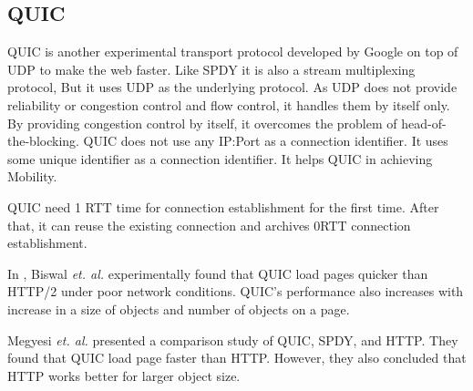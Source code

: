 \subsection{QUIC}
QUIC\cite{quic} is another experimental transport protocol developed by Google on top of UDP to make the web faster. Like SPDY it is also a stream multiplexing protocol, But it uses UDP as the underlying protocol. As UDP does not provide reliability or congestion control and flow control, it handles them by itself only. By providing congestion control by itself, it overcomes the problem of head-of-the-blocking. QUIC does not use any IP:Port as a connection identifier. It uses some unique identifier as a connection identifier. It helps QUIC in achieving Mobility.

QUIC need 1 RTT time for connection establishment for the first time. After that, it can reuse the existing connection and archives 0RTT connection establishment. 

In \cite{quicmakewebfast}, Biswal \textit{et. al.} experimentally found that QUIC load pages quicker than HTTP/2 under poor network conditions. QUIC's performance also increases with increase in a size of objects and number of objects on a page.

Megyesi \textit{et. al.} presented a comparison study of QUIC, SPDY, and HTTP\cite{quicisquic}. They found that QUIC load page faster than HTTP. However, they also concluded that HTTP works better for larger object size.